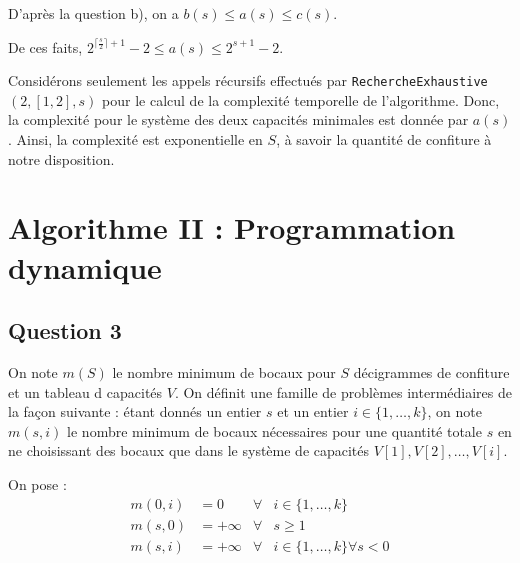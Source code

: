 \documentclass[12pt,a4paper]{article}
\begin{document}
\begin{enumerate}[a)]
D'apr\`es la question b), on a $ b(s) \leq a(s) \leq c(s) $. 

De ces faits, $ 2^{\lceil \frac{s}{2} \rceil + 1} - 2 \leq a(s) \leq 2^{s+1} - 2 $.

Consid\'erons seulement les appels r\'ecursifs effectu\'es par \texttt{RechercheExhaustive}$(2,[1,2],s)$ pour le calcul de la complexit\'e temporelle de l'algorithme.
Donc, la complexit\'e pour le syst\`eme des deux capacit\'es minimales est donn\'ee par $a(s)$. Ainsi, la complexit\'e est exponentielle en $S$, \`a savoir la quantit\'e de confiture \`a notre disposition.

\end{enumerate}

\section{Algorithme II : Programmation dynamique}

\subsection*{Question 3}
On note $m(S)$ le nombre minimum de bocaux pour $S$ d\'ecigrammes de confiture et un tableau d capacit\'es $V$. On d\'efinit une famille de probl\`emes interm\'ediaires de la fa\c{c}on suivante : \'etant donn\'es un entier $s$ et un entier $i \in \{1, \dotsc, k\}$, on note $m(s,i)$ le nombre minimum de bocaux n\'ecessaires pour une quantit\'e totale $s$ en ne choisissant des bocaux que dans le syst\`eme de capacit\'es $V[1],V[2],\dotsc,V[i]$.

On pose :
\begin{align*}
 m(0,i) &= 0 & \forall & i \in \{1,\dotsc, k\} \\
 m(s,0) &= +\infty & \forall & s \geq 1 \\
 m(s,i) &= + \infty & \forall & i \in \{1,\dotsc,k\} \forall s < 0
\end{align*}
\end{document}
